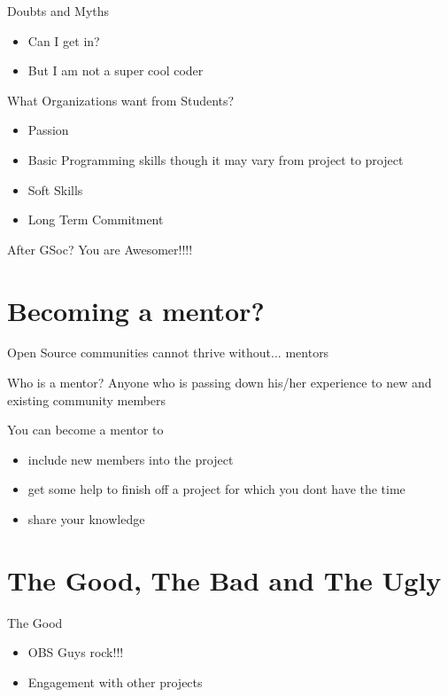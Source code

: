 \documentclass{beamer}
\begin{document}
\begin{frame}{Doubts and Myths}
\begin{itemize}
\pause
\item Can I get in? \pause
\item But I am not a super cool coder 
\end{itemize}
\end{frame}

\begin{frame}{What Organizations want from Students?}
\begin{itemize}
\pause
\item Passion \pause
\item Basic Programming skills though it may vary from project to project \pause
\item Soft Skills \pause
\item Long Term Commitment
\end{itemize}
\end{frame}

\begin{frame}{After GSoc?}
\pause
You are Awesomer!!!!
\end{frame}

\section{Becoming a mentor?}
\begin{frame}{Open Source communities cannot thrive without...}
\pause
mentors
\end{frame}

\begin{frame}{Who is a mentor?}
\pause
Anyone who is passing down his/her experience to new and existing community members
\end{frame}


\begin{frame}{You can become a mentor to}
\pause
\begin{itemize}
\item include new members into the project \pause
\item get some help to finish off a project for which you dont have the time \pause
\item share your knowledge \pause
\end{itemize}
\end{frame} 

\section{The Good, The Bad and The Ugly}
\begin{frame}{The Good}
\pause
\begin{itemize}
\item OBS Guys rock!!! \pause
\item Engagement with other projects \pause
\end{itemize}
\end{frame}
\end{document}
